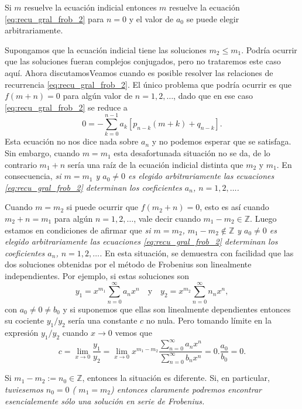 \documentclass{article}
\newcounter{ejemplo_cont}
\begin{document}
Si $m$ resuelve la ecuación indicial entonces $m$ resuelve la ecuación \eqref{eq:recu_gral_frob_2} para $n=0$ y el valor de $a_0$ se puede elegir arbitrariamente. 

Supongamos que la ecuación indicial tiene las soluciones $m_2\leq m_1$. Podría ocurrir que las soluciones fueran complejos conjugados, pero no trataremos este caso aquí. Ahora discutamosVeamos  cuando es posible resolver las relaciones de recurrencia \eqref{eq:recu_gral_frob_2}. El único problema que podría ocurrir es que  $f(m+n)=0$ para algún valor de $n=1,2,\ldots$, dado que en ese caso \eqref{eq:recu_gral_frob_2} se reduce a 
\begin{equation}\label{eq:ec_enter} 0=-\sum_{k=0}^{n-1}a_k\left[p_{n-k}(m+k) +
q_{n-k}\right].
\end{equation}
Esta ecuación no nos dice nada sobre $a_n$ y no podemos esperar que se satisfaga. Sin embargo, cuando $m=m_1$ esta desafortunada situación no se da, de lo contrario  $m_1+n$ sería una raíz de la ecuación indicial distinta que $m_2$ y $m_1$. En consecuencia, \emph{si $m=m_1$ y $a_0\neq 0$ es elegido arbitrariamente las ecuaciones \eqref{eq:recu_gral_frob_2} determinan los coeficientes $a_n$, $n=1,2,\ldots$.}

Cuando $m=m_2$ si puede ocurrir que $f(m_2+n)=0$, esto es así cuando $m_2+n=m_1$ para algún $n=1,2,\ldots$, vale decir cuando $m_1-m_2\in\mathbb{Z}$.  Luego estamos en condiciones de afirmar que \emph{si $m=m_2$, $m_1-m_2\notin \mathbb{Z}$ y $a_0\neq 0$ es elegido arbitrariamente las ecuaciones \eqref{eq:recu_gral_frob_2} determinan los coeficientes $a_n$, $n=1,2,\ldots$.} En esta situación, se demuestra con facilidad que las dos soluciones obtenidas por el método de Frobenius son linealmente independientes. Por ejemplo, si estas soluciones son
\[y_1=x^{m_1}\sum_{n=0}^{\infty}a_nx^n\quad\text{y}\quad y_2=x^{m_2}\sum_{n=0}^{\infty}n_nx^n,\]
con $a_0\neq 0\neq b_0$ y si suponemos que ellas son linealmente dependientes entonces su cociente $y_1/y_2$ sería una constante $c$  no nula. Pero tomando límite en la expresión $y_1/y_2$ cuando $x\to 0$ vemos que
\[c=\lim_{x\to 0} \frac{y_1}{y_2}=\lim_{x\to 0} x^{m_1-m_2}\frac{\sum_{n=0}^{\infty}a_nx^n}{ \sum_{n=0}^{\infty}b_nx^n  }=0.\frac{a_0}{b_0}=0.\]

Si $m_1-m_2:=n_0\in\mathbb{Z}$, entonces la situación es diferente. Si, en particular,  \emph{tuviesemos $n_0=0$ ( $m_1=m_2$) entonces claramente podremos encontrar esencialemente sólo una solución en serie de Frobenius.}   
\end{document}
